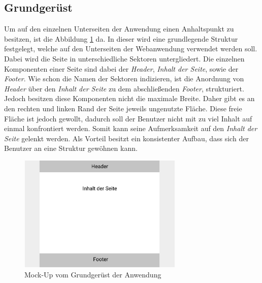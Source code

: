 \subsection{Grundgerüst}

Um auf den einzelnen Unterseiten der Anwendung einen Anhaltspunkt zu besitzen, ist die Abbildung \ref{fig:MockGrundgeruest} da. 
In dieser wird eine grundlegende Struktur festgelegt, welche auf den Unterseiten der Webanwendung verwendet werden soll.
Dabei wird die Seite in unterschiedliche Sektoren untergliedert.
Die einzelnen Komponenten einer Seite sind dabei der \emph{Header}, \emph{Inhalt der Seite}, sowie der \emph{Footer}. 
Wie schon die Namen der Sektoren indizieren, ist die Anordnung von \emph{Header} über den \emph{Inhalt der Seite} zu dem abschließenden \emph{Footer}, strukturiert.
Jedoch besitzen diese Komponenten nicht die maximale Breite.
Daher gibt es an den rechten und linken Rand der Seite jeweils ungenutzte Fläche. 
Diese freie Fläche ist jedoch gewollt, dadurch soll der Benutzer nicht mit zu viel Inhalt auf einmal konfrontiert werden.
Somit kann seine Aufmerksamkeit auf den \emph{Inhalt der Seite} gelenkt werden.
Als Vorteil besitzt ein konsistenter Aufbau, dass sich der Benutzer an eine Struktur gewöhnen kann. 

\begin{figure}[H]
	\centering
	\includegraphics[width=0.7\textwidth]{img/konzeption/client/grundgeruest}
	\captionsetup{justification=centering, format=plain}
	\caption[Mock-Up vom Grundgerüst der Anwendung]{Mock-Up vom Grundgerüst der Anwendung \\\figma}
	\label{fig:MockGrundgeruest}
\end{figure}

